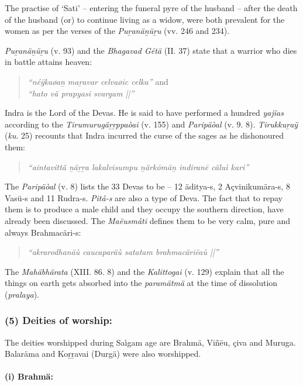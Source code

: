 The practise of ‘Sati’ – entering the funeral pyre of the husband – after the death of the husband (or) to continue living as a widow, were both prevalent for the women as per the verses of the \textit{Puṟanäṉüṟu} (vv. 246 and 234).

\textit{Puṟanäṉüṟu} (v. 93) and the \textit{Bhagavad Gétä} (II. 37) state that a warrior who dies in battle attains heaven:

\begin{verse}
\textit{“néÿkaøaṉ maṟavar celvaøic celka”} and \\\textit{“hato vä prapyasi svargam ||”}
\end{verse}

Indra is the Lord of the Devas. He is said to have performed a hundred \textit{yajïas} according to the \textit{Tirumurugäṟṟppaòai} (v. 155) and \textit{Paripäòal} (v. 9. 8). \textit{Tirukkuṟaÿ} (\textit{ku}. 25) recounts that Indra incurred the curse of the sages as he dishonoured them:

\begin{verse}
\textit{“aintavittä ṉäṟṟa lakalvisumpu ṉärkōmäṉ indiranē cäluì kari”}
\end{verse}

The \textit{Paripäòal} (v. 8) lists the 33 Devas to be – 12 äditya-s, 2 Açvinikumära-s, 8 Vasü-s and 11 Rudra-s. \textit{Pitå-s} are also a type of Deva. The fact that to repay them is to produce a male child and they occupy the southern direction, have already been discussed. The \textit{Maëusmåti} defines them to be very calm, pure and always Brahmacäri-s:

\begin{verse}
\textit{“akrarodhanäù caucaparäù satatam brahmacäriëaù ||”}
\end{verse}

The \textit{Mahäbhärata} (XIII. 86. 8) and the \textit{Kalittogai} (v. 129) explain that all the things on earth gets absorbed into the \textit{paramätmä} at the time of dissolution (\textit{pralaya}).


\subsubsection*{(5) Deities of worship:}

The deities worshipped during Saìgam age are Brahmä, Viñëu, çiva and Muruga. Balaräma and Koṟṟavai (Durgä) were also worshipped.

\paragraph*{(i) Brahmä:}


